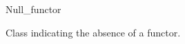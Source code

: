 \begin{ccRefClass}{Null_functor}
\label{Null_functor}

\ccDefinition
Class indicating the absence of a functor. 

\ccIsModel
{}

\ccSeeAlso
{}\\
\\
\end{ccRefClass} 